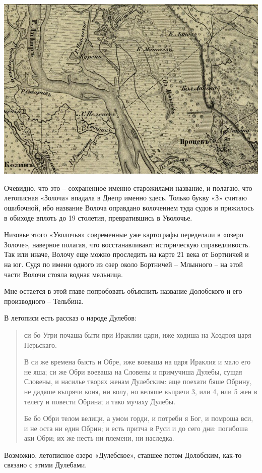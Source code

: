 \begin{center}
\includegraphics[width=\linewidth]{chast-gorodki/terbin/s_volocha-02.jpg}
\end{center}

Очевидно, что это – сохраненное именно старожилами название, и полагаю, что летописная «Золоча» впадала в Днепр именно здесь. Только букву «З» считаю ошибочной, ибо название Волоча оправдано волочением туда судов и прижилось в обиходе вплоть до 19 столетия, превратившись в Уволочье.

Низовье этого «Уволочья» современные уже картографы переделали в «озеро Золоче», наверное полагая, что восстанавливают историческую справедливость. Так или иначе, Волочу еще можно проследить на карте 21 века от Бортничей и на юг. Судя по имени одного из озер около Бортничей – Млынного – на этой части Волочи стояла водная мельница.

Мне остается в этой главе попробовать объяснить название Долобского и его производного – Тельбина.

В летописи есть рассказ о народе Дулебов:

\begin{quotation}
си бо Угри почаша быти при Ираклии цари, иже ходиша на Хоздроя царя Перьскаго.

В си же времена бысть и Обре, иже воеваша на царя Ираклия и мало его не яша; си же Обри воеваша на Словены и примучиша Дулебы, сущая Словены, и насилье творях женам Дулебским: аще поехати бяше Обрину, не дадяше въпрячи коня, ни волу, но веляше въпрячи 3, или 4, или 5 жен в телегу и повести Обрина; и тако мучаху Дулебы.

Бе бо Обри телом велици, а умом горди, и потреби я Бог, и помроша вси, и не оста ни един Обрин; и есть притча в Руси и до сего дни: погибоша аки Обри; их же несть ни племени, ни наследка.
\end{quotation} 

Возможно, летописное озеро «Дулебское», ставшее потом Долобским, как-то связано с этими Дулебами.
